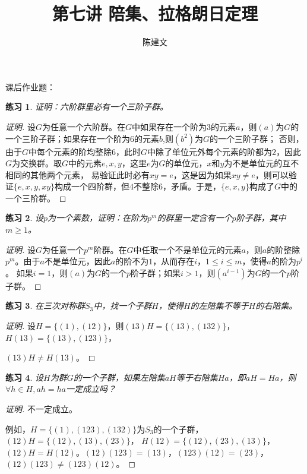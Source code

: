 \documentclass{article}
\newtheorem{Exercise}{练习}
\begin{document}
\begin{CJK*}{UTF8}{gbsn}
  \title{第七讲 陪集、拉格朗日定理}
  \author{陈建文}
  \maketitle
  

课后作业题：
\begin{Exercise}
证明：六阶群里必有一个三阶子群。
\end{Exercise}
\begin{proof}[证明]
  设$G$为任意一个六阶群。在$G$中如果存在一个阶为$3$的元素$a$，则$(a)$为$G$的一个三阶子群；如果存在一个阶为$6$的元素$b$,则$(b^2)$为$G$的一个三阶子群；
否则，由于$G$中每个元素的阶均整除$6$，此时$G$中除了单位元外每个元素的阶都为$2$，因此$G$为交换群。取$G$中的元素$e,x,y$，这里$e$为$G$的单位元，$x$和$y$为不是单位元的互不相同的其他两个元素，
易验证此时必有$xy=e$，这是因为如果$xy\neq e$，则可以验证$\{e,x,y,xy\}$构成一个四阶群，但$4$不整除$6$，矛盾。于是，$\{e,x,y\}$构成了$G$中的一个三阶群。
\end{proof}
\begin{Exercise}
设$p$为一个素数，证明：在阶为$p^m$的群里一定含有一个$p$阶子群，其中$m\geq 1$。
\end{Exercise}
\begin{proof}[证明]
  设$G$为任意一个$p^m$阶群。在$G$中任取一个不是单位元的元素$a$，则$a$的阶整除$p^m$。由于$a$不是单位元，因此$a$的阶不为$1$，从而存在$i$，$1\leq i\leq m$，使得$a$的阶为$p^i$。
  如果$i=1$，则$(a)$为$G$的一个$p$阶子群；如果$i>1$，则$(a^{i-1})$为$G$的一个$p$阶子群。
\end{proof}
\begin{Exercise}
在三次对称群$S_3$中，找一个子群$H$，使得$H$的左陪集不等于$H$的右陪集。
\end{Exercise}
\begin{proof}[证明]
  设$H=\{(1),(12)\}$，则$(13)H=\{(13),(132)\}$，$H(13)=\{(13),(123)\}$， 
  
  $(13)H\neq H(13)$。
\end{proof}
\begin{Exercise}
设$H$为群$G$的一个子群，如果左陪集$aH$等于右陪集$Ha$，即$aH=Ha$，则$\forall h\in H, ah=ha$一定成立吗？
\end{Exercise}
\begin{proof}[证明]
  不一定成立。

  例如，$H=\{(1),(123),(132)\}$为$S_3$的一个子群，$(12)H=\{(12),(13),(23)\}$，
  $H(12)=\{(12),(23),(13)\}$，$(12)H=H(12)$。$(12)(123)=(13)$，$(123)(12)=(23)$，$(12)(123)\neq (123)(12)$。
\end{proof}
\end{CJK*}
\end{document}
